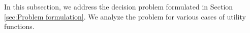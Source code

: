 In this subsection, we address the decision problem formulated in Section \ref{sec:Problem formulation}.
%
%
We analyze the problem for various cases of utility functions.\\
